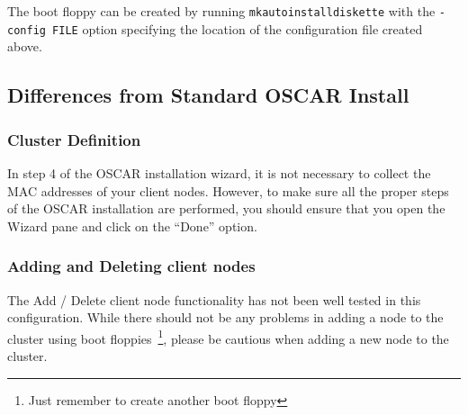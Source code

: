 The boot floppy can be created by running {\tt mkautoinstalldiskette}
with the {\tt -config FILE} option specifying the location of the
configuration file created above.

\subsection{Differences from Standard OSCAR Install}

\subsubsection{Cluster Definition}

In step 4 of the OSCAR installation wizard, it is not necessary to
collect the MAC addresses of your client nodes.  However, to make sure
all the proper steps of the OSCAR installation are performed, you
should ensure that you open the Wizard pane and click on the ``Done''
option.

\subsubsection{Adding and Deleting client nodes}

The Add / Delete client node functionality has not been well tested in
this configuration.  While there should not be any problems in adding
a node to the cluster using boot floppies~\footnote{Just remember to
create another boot floppy}, please be cautious when adding a new node
to the cluster.
